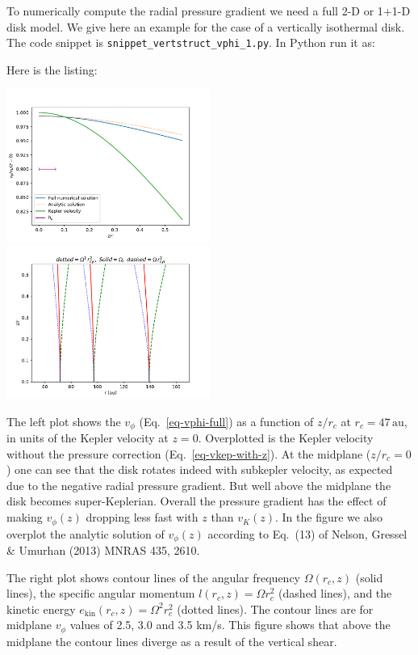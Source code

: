 \documentclass{book}
\newcommand{\code}[1]{{\small\tt #1}}
\begin{document}
To numerically compute the radial pressure gradient we need a full 2-D or 1+1-D
disk model. We give here an example for the case of a vertically isothermal
disk. 
The code snippet is
\code{snippet\_vertstruct\_vphi\_1.py}. In Python run it as:
\begin{codebox}
\end{codebox}
Here is the listing:

\centerline{\includegraphics[width=0.5\textwidth]{../snippets/fig_snippet_vertstruct_vphi_1_1.pdf}
\includegraphics[width=0.5\textwidth]{../snippets/fig_snippet_vertstruct_vphi_1_2.pdf}}
%
The left plot shows the $v_\phi$ (Eq.~\ref{eq-vphi-full}) as a function of $z/r_c$
at $r_c=47\,\mathrm{au}$, in units of the Kepler velocity at $z=0$. Overplotted
is the Kepler velocity without the pressure correction
(Eq.~\ref{eq-vkep-with-z}). At the midplane ($z/r_c=0$) one can see that the
disk rotates indeed with subkepler velocity, as expected due to the negative
radial pressure gradient. But well above the midplane the disk becomes
super-Keplerian. Overall the pressure gradient has the effect of making
$v_\phi(z)$ dropping less fast with $z$ than $v_K(z)$. In the figure we also
overplot the analytic solution of $v_{\phi}(z)$ according to Eq.~(13) of
Nelson, Gressel \& Umurhan (2013) MNRAS 435, 2610.

The right plot shows contour lines of the angular frequency $\Omega(r_c,z)$
(solid lines), the specific angular momentum $l(r_c,z)=\Omega r_c^2$ (dashed lines),
and the kinetic energy $e_{\mathrm{kin}}(r_c,z)=\Omega^2 r_c^2$ (dotted lines). The
contour lines are for midplane $v_\phi$ values of 2.5, 3.0 and 3.5 km/s. This
figure shows that above the midplane the contour lines diverge as a result of the
vertical shear.
\end{document}
